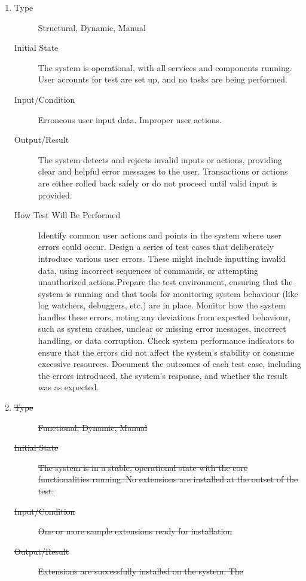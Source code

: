 \documentclass[12pt, titlepage]{article}
\begin{document}
\begin{enumerate}[NFR-T1]
\item \label{NFRT4}
  \begin{description}
  \item[Type] Structural, Dynamic, Manual
  \item[Initial State] The system is operational, with all services and components
    running. User accounts for test are set up, and no tasks are being
    performed.
  \item[Input/Condition] Erroneous user input data. Improper user actions.
  \item[Output/Result] The system detects and rejects invalid inputs or actions,
    providing clear and helpful error messages to the user. Transactions or
    actions are either rolled back safely or do not proceed until valid input is
    provided.
  \item[How Test Will Be Performed] Identify common user actions and points in the
    system where user errors could occur. Design a series of test cases that
    deliberately introduce various user errors. These might include inputting
    invalid data, using incorrect sequences of commands, or attempting
    unauthorized actions.Prepare the test environment, ensuring that the system
    is running and that tools for monitoring system behaviour (like log
    watchers, debuggers, etc.) are in place. Monitor how the system handles
    these errors, noting any deviations from expected behaviour, such as system
    crashes, unclear or missing error messages, incorrect handling, or data
    corruption. Check system performance indicators to ensure that the errors
    did not affect the system's stability or consume excessive resources.
    Document the outcomes of each test case, including the errors introduced,
    the system's response, and whether the result was as expected.
  \end{description}
\item \label{NFRT5}
  \begin{description}
  \item[\sout{Type}] \sout{Functional, Dynamic, Manual}
  \item[\sout{Initial State}] \sout{The system is in a stable, operational state with the core
    functionalities running. No extensions are installed at the outset of the
    test.}
  \item[\sout{Input/Condition}] \sout{One or more sample extensions ready for installation}
  \item[\sout{Output/Result}] \sout{Extensions are successfully installed on the system. The
}
\end{description}
\end{enumerate}
\end{document}
